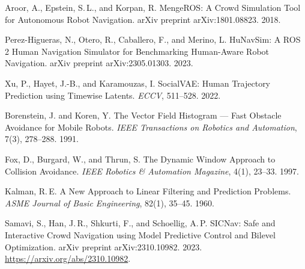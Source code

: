 \documentclass[12pt, a4paper]{article}
\begin{document}
\begin{enumerate}[label={[\arabic*]}, leftmargin=*, itemsep=4pt]
\item Aroor, A., Epstein, S.\,L., and Korpan, R. MengeROS: A Crowd Simulation Tool for Autonomous Robot Navigation. arXiv preprint arXiv:1801.08823. 2018.

\item Perez-Higueras, N., Otero, R., Caballero, F., and Merino, L. HuNavSim: A ROS 2 Human Navigation Simulator for Benchmarking Human-Aware Robot Navigation. arXiv preprint arXiv:2305.01303. 2023.

\item Xu, P., Hayet, J.-B., and Karamouzas, I. SocialVAE: Human Trajectory Prediction using Timewise Latents. \textit{ECCV}, 511--528. 2022.

\item Borenstein, J. and Koren, Y. The Vector Field Histogram --- Fast Obstacle Avoidance for Mobile Robots. \textit{IEEE Transactions on Robotics and Automation}, 7(3), 278--288. 1991.

\item Fox, D., Burgard, W., and Thrun, S. The Dynamic Window Approach to Collision Avoidance. \textit{IEEE Robotics \& Automation Magazine}, 4(1), 23--33. 1997.

\item Kalman, R.\,E. A New Approach to Linear Filtering and Prediction Problems. \textit{ASME Journal of Basic Engineering}, 82(1), 35--45. 1960.

\item Samavi, S., Han, J.\,R., Shkurti, F., and Schoellig, A.\,P. SICNav: Safe and Interactive Crowd Navigation using Model Predictive Control and Bilevel Optimization. arXiv preprint arXiv:2310.10982. 2023. \url{https://arxiv.org/abs/2310.10982}.

\end{enumerate}
\end{document}
